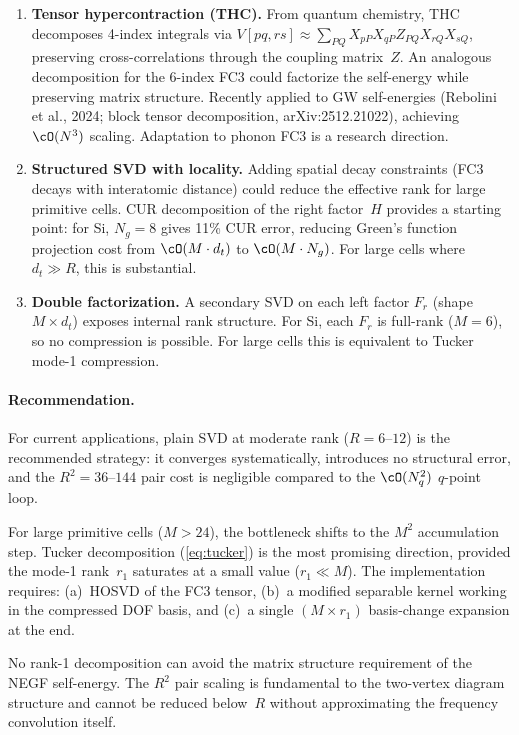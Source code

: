 \begin{enumerate}
  \item \textbf{Tensor hypercontraction (THC).}  From quantum
    chemistry, THC decomposes 4-index integrals via
    $V[pq,rs] \approx \sum_{PQ} X_{pP} X_{qP} Z_{PQ} X_{rQ} X_{sQ}$,
    preserving cross-correlations through the coupling matrix~$Z$.
    An analogous decomposition for the 6-index FC3 could factorize
    the self-energy while preserving matrix structure.  Recently
    applied to GW self-energies (Rebolini et al., 2024; block tensor
    decomposition, arXiv:2512.21022), achieving $\cO(N^3)$ scaling.
    Adaptation to phonon FC3 is a research direction.

  \item \textbf{Structured SVD with locality.}  Adding spatial decay
    constraints (FC3 decays with interatomic distance) could reduce
    the effective rank for large primitive cells.  CUR decomposition
    of the right factor~$H$ provides a starting point: for Si,
    $N_g = 8$ gives 11\% CUR error, reducing Green's function
    projection cost from $\cO(M \cdot d_t)$ to $\cO(M \cdot N_g)$.
    For large cells where $d_t \gg R$, this is substantial.

  \item \textbf{Double factorization.}  A secondary SVD on each
    left factor $F_r$ (shape $M \times d_t$) exposes internal rank
    structure.  For Si, each $F_r$ is full-rank ($M = 6$), so no
    compression is possible.  For large cells this is equivalent to
    Tucker mode-1 compression.
\end{enumerate}

\paragraph{Recommendation.}
For current applications, plain SVD at moderate rank ($R = 6$--$12$)
is the recommended strategy: it converges systematically, introduces
no structural error, and the $R^2 = 36$--$144$ pair cost is
negligible compared to the $\cO(N_q^2)$ $q$-point loop.

For large primitive cells ($M > 24$), the bottleneck shifts to the
$M^2$ accumulation step.  Tucker decomposition (\cref{eq:tucker}) is
the most promising direction, provided the mode-1 rank~$r_1$
saturates at a small value ($r_1 \ll M$).  The implementation
requires: (a)~HOSVD of the FC3 tensor, (b)~a modified separable
kernel working in the compressed DOF basis, and (c)~a single
$(M \times r_1)$ basis-change expansion at the end.

No rank-1 decomposition can avoid the matrix structure requirement of
the NEGF self-energy.  The $R^2$ pair scaling is fundamental to the
two-vertex diagram structure and cannot be reduced below~$R$ without
approximating the frequency convolution itself.
